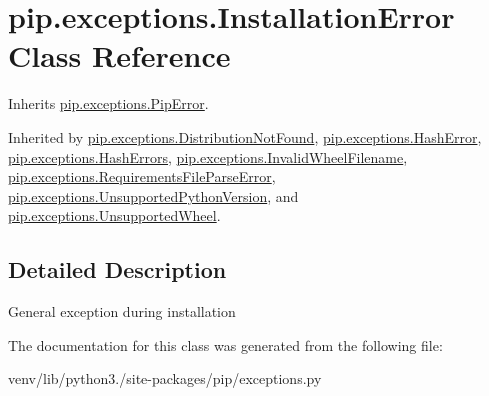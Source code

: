 \hypertarget{classpip_1_1exceptions_1_1_installation_error}{}\section{pip.\+exceptions.\+Installation\+Error Class Reference}
\label{classpip_1_1exceptions_1_1_installation_error}


Inherits \hyperlink{classpip_1_1exceptions_1_1_pip_error}{pip.\+exceptions.\+Pip\+Error}.



Inherited by \hyperlink{classpip_1_1exceptions_1_1_distribution_not_found}{pip.\+exceptions.\+Distribution\+Not\+Found}, \hyperlink{classpip_1_1exceptions_1_1_hash_error}{pip.\+exceptions.\+Hash\+Error}, \hyperlink{classpip_1_1exceptions_1_1_hash_errors}{pip.\+exceptions.\+Hash\+Errors}, \hyperlink{classpip_1_1exceptions_1_1_invalid_wheel_filename}{pip.\+exceptions.\+Invalid\+Wheel\+Filename}, \hyperlink{classpip_1_1exceptions_1_1_requirements_file_parse_error}{pip.\+exceptions.\+Requirements\+File\+Parse\+Error}, \hyperlink{classpip_1_1exceptions_1_1_unsupported_python_version}{pip.\+exceptions.\+Unsupported\+Python\+Version}, and \hyperlink{classpip_1_1exceptions_1_1_unsupported_wheel}{pip.\+exceptions.\+Unsupported\+Wheel}.



\subsection{Detailed Description}
\begin{DoxyVerb}General exception during installation\end{DoxyVerb}
 

The documentation for this class was generated from the following file\+:\begin{DoxyCompactItemize}
\item 
venv/lib/python3./site-\/packages/pip/exceptions.\+py\end{DoxyCompactItemize}
